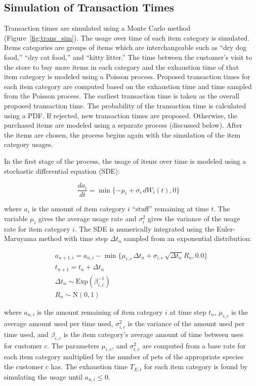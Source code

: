 \subsection{Simulation of Transaction Times} \label{sec:transaction-times}
Transaction times are simulated using a Monte Carlo method (Figure~\ref{fig:trans_sim}).  The usage over time of each item category is simulated. Items categories are groups of items which are interchangeable such as ``dry dog food,'' ``dry cat food,'' and ``kitty litter.'' The time between the customer's visit to the store to buy more items in each category and the exhaustion time of that item category is modeled using a Poisson process. Proposed transaction times for each item category are computed based on the exhaustion time and time sampled from the Poisson process. The earliest transaction time is taken as the overall proposed transaction time.  The probability of the transaction time is calculated using a PDF.  If rejected, new transaction times are proposed.  Otherwise, the purchased items are modeled using a separate process (discussed below). After the items are chosen, the process begins again with the simulation of the item category usages.

In the first stage of the process, the usage of items over time is modeled using a stochastic differential equation (SDE):

\begin{equation*}
\frac{da_i}{dt} = \min \{-\mu_i + \sigma_i\, dW_i(t), 0\}
\end{equation*}

where $a_i$ is the amount of item category $i$ ``stuff'' remaining at time $t$. The variable $\mu_i$ gives the average usage rate and $\sigma^2_i$ gives the variance of the usage rate for item category $i$. The SDE is numerically integrated using the Euler-Maruyama method\cite{Klouden13} with time step $\Delta t_n$ sampled from an exponential distribution:

\begin{align*}
&a_{n+1, i} = a_{n,i} - \min \{\mu_{i, c} \, \Delta t_n + \sigma_{i, c} \, \sqrt{\Delta t_n} R_n, 0.0\} \\
&t_{n+1} = t_n + \Delta t_n \\
&\Delta t_n \sim \text{Exp}(\beta^{-1}_{i,c}) \\
&R_n \sim \text{N}(0, 1)
\end{align*}

where $a_{n, i}$ is the amount remaining of item category $i$ at time step $t_n$, $\mu_{i,c}$ is the average amount used per time used, $\sigma^2_{i,c}$ is the variance of the amount used per time used, and $\beta_{i,c}$ is the item category's average amount of time between uses for customer $c$.  The parameters $\mu_{i, c}$, and $\sigma^2_{i,c}$ are computed from a base rate for each item category multiplied by the number of pets of the appropriate species the customer $c$ has.  The exhaustion time $T_{E,i}$ for each item category is found by simulating the usage until $a_{n,i} \leq 0$.


